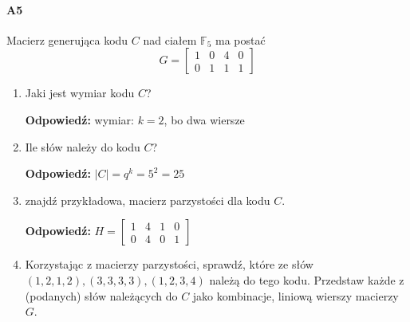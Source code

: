 \paragraph{A5} Macierz generująca kodu $C$ nad ciałem $\mathbb{F}_5$ ma postać
$$G =\begin{bmatrix}
1& 0& 4& 0\\
0& 1& 1& 1 \end{bmatrix}$$
\begin{enumerate}[label=\alph*)]
\item Jaki jest wymiar kodu $C$?

\textbf{Odpowiedź: }wymiar: $k=2$, bo dwa wiersze
\item Ile słów należy do kodu $C$?

\textbf{Odpowiedź: }$|C|=q^k=5^2=25$
\item znajdź przykładowa, macierz parzystości dla kodu $C$.

\textbf{Odpowiedź: }$H=\begin{bmatrix}
1&4&1&0\\0&4&0&1
\end{bmatrix}$
\item  Korzystając z macierzy parzystości, sprawdź, które ze słów $(1, 2, 1, 2),(3, 3, 3, 3),(1, 2, 3, 4)$ należą do tego kodu. Przedstaw każde z (podanych) słów należących do $C$ jako kombinacje, liniową wierszy macierzy $G$.


\end{enumerate}
